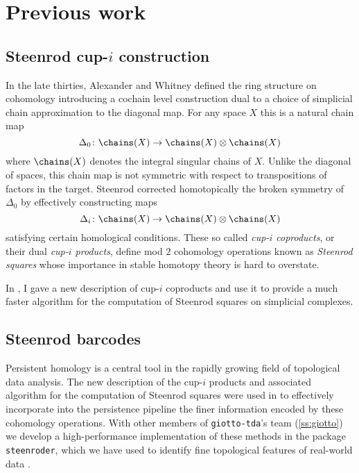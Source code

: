 
\section{Previous work}

\subsection{Steenrod cup-$i$ construction} \label{ss:cup-i}

In the late thirties, Alexander and Whitney defined the ring structure on cohomology introducing a cochain level construction dual to a choice of simplicial chain approximation to the diagonal map.
For any space $X$ this is a natural chain map
\[
\Delta_0 \colon \chains(X) \to \chains(X) \otimes \chains(X)
\]
where $\chains(X)$ denotes the integral singular chains of $X$.
Unlike the diagonal of spaces, this chain map is not symmetric with respect to transpositions of factors in the target.
Steenrod \cite{steenrod1947products} corrected homotopically the broken symmetry of $\Delta_0$ by effectively constructing maps
\begin{equation*}
\Delta_i \colon \chains(X) \to \chains(X) \otimes \chains(X)
\end{equation*}
satisfying certain homological conditions.
These so called \textit{cup-$i$ coproducts}, or their dual \textit{cup-$i$ products}, define mod $2$ cohomology operations known as \textit{Steenrod squares} whose importance in stable homotopy theory is hard to overstate.

In \cite{medina2021newformulas}, I gave a new description of cup-$i$ coproducts and use it to provide a much faster algorithm for the computation of Steenrod squares on simplicial complexes.

\subsection{Steenrod barcodes}

Persistent homology is a central tool in the rapidly growing field of topological data analysis.
The new description of the cup-$i$ products and associated algorithm for the computation of Steenrod squares were used in \cite{medina2018persistence} to effectively incorporate into the persistence pipeline the finer information encoded by these cohomology operations.
With other members of \texttt{giotto-tda}'s team (\cref{ss:giotto}) we develop a high-performance implementation of these methods in the package \texttt{steenroder}, which we have used to identify fine topological features of real-world data \cite{medina2018persistence}.

